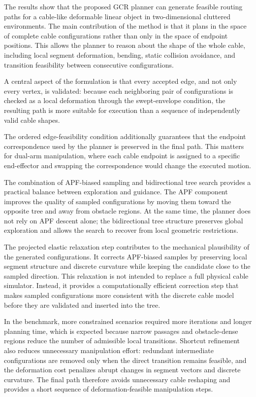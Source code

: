 \documentclass{pas}
\begin{document}
The results show that the proposed GCR planner can generate feasible routing
paths for a cable-like deformable linear object in two-dimensional cluttered
environments. The main contribution of the method is that it plans in the space
of complete cable configurations rather than only in the space of endpoint
positions. This allows the planner to reason about the shape of the whole cable,
including local segment deformation, bending, static collision avoidance, and
transition feasibility between consecutive configurations.

A central aspect of the formulation is that every accepted edge, and not only
every vertex, is validated: because each neighboring pair of configurations is
checked as a local deformation through the swept-envelope condition, the
resulting path is more suitable for execution than a sequence of independently
valid cable shapes.

The ordered edge-feasibility condition additionally guarantees that the endpoint correspondence used by the planner is preserved in the final path. This matters for dual-arm manipulation, where each cable endpoint is assigned to a specific end-effector and swapping the correspondence would change the executed motion.

The combination of APF-biased sampling and bidirectional tree search provides a
practical balance between exploration and guidance. The APF component improves
the quality of sampled configurations by moving them toward the opposite tree
and away from obstacle regions. At the same time, the planner does not rely on
APF descent alone; the bidirectional tree structure preserves global exploration
and allows the search to recover from local geometric restrictions.

The projected elastic relaxation step contributes to the mechanical plausibility
of the generated configurations. It corrects APF-biased samples by preserving
local segment structure and discrete curvature while keeping the candidate close
to the sampled direction. This relaxation is not intended to replace a full
physical cable simulator. Instead, it provides a computationally efficient
correction step that makes sampled configurations more consistent with the
discrete cable model before they are validated and inserted into the tree.

In the benchmark, more constrained scenarios required more iterations and longer planning time, which is expected because narrow passages and obstacle-dense regions reduce the number of admissible local transitions. Shortcut refinement also reduces unnecessary manipulation effort: redundant intermediate configurations are removed only when the direct transition remains feasible, and the deformation cost penalizes abrupt changes in segment vectors and discrete curvature. The final path therefore avoids unnecessary cable reshaping and provides a short sequence of deformation-feasible manipulation steps.
\end{document}
